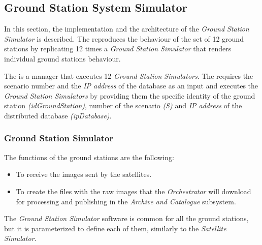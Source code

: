 \subsection{Ground Station System Simulator}

In this section, the implementation and the architecture of the \emph{Ground Station Simulator} is described. The \gsss reproduces the behaviour of the set of 12 ground stations by replicating 12 times a \emph{Ground Station Simulator} that renders individual ground stations behaviour. 

The \gsss is a manager that executes 12 \emph{Ground Station Simulators}. The
\gsss requires the scenario number and the \emph{IP address} of the database as
an input and executes the \emph{Ground Station  Simulators} by providing them
the specific identity of the ground station \emph{(idGroundStation)}, number of
the scenario \emph{(S)} and \emph{IP address} of the distributed database
\emph{(ipDatabase)}.

\subsubsection{Ground Station Simulator}

The functions of the ground stations are the following:
\begin{itemize}
\item To receive the images sent by the satellites.
\item To create the files with the raw images that the \emph{Orchestrator} will
  download for processing and publishing in the \emph{Archive and Catalogue} subsystem.
\end{itemize}

The \emph{Ground Station Simulator} software is common for all the ground stations, but it is parameterized to define each of them, similarly to the \emph{Satellite Simulator}. 

